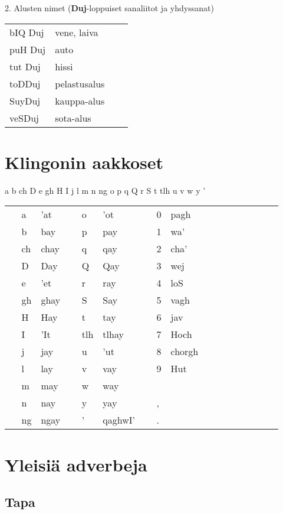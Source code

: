 \documentclass{book}
\begin{document}
2. Alusten nimet (\textbf{Duj}-loppuiset sanaliitot ja yhdyssanat)

\begin{tabular}{Bl Il}
    bIQ Duj & vene, laiva \\
    puH Duj & auto \\
    tut Duj & hissi \\
    toDDuj & pelastusalus \\
    SuyDuj & kauppa-alus \\
    veSDuj & sota-alus \\
\end{tabular}

\appendix
\chapter{Klingonin aakkoset}

a b ch D e gh H I j l m n ng o p q Q r S t tlh u v w y ' 

\begin{tabular}{Tl Bl Il | Tl Bl Il | Tl l Il}
     & a & 'at &  & o & 'ot &  & 0 & pagh \\
     & b & bay &  & p & pay &  & 1 & wa' \\
     & ch & chay &  & q & qay &  & 2 & cha' \\
     & D & Day &  & Q & Qay &  & 3 & wej \\
     & e & 'et &  & r & ray &  & 4 & loS \\
     & gh & ghay &  & S & Say &  & 5 & vagh \\
     & H & Hay &  & t & tay &  & 6 & jav \\
     & I & 'It &  & tlh & tlhay &  & 7 & Hoch \\
     & j & jay &  & u & 'ut &  & 8 & chorgh\\
     & l & lay &  & v & vay &  & 9 & Hut\\
     & m & may &  & w & way & & & \\
     & n & nay &  & y & yay &  & , & \\
     & ng & ngay &  & ' & qaghwI' &  & . & \\
\end{tabular}

\chapter{Yleisiä adverbeja}
\label{apx:adverbit}

\section{Tapa}
\end{document}

